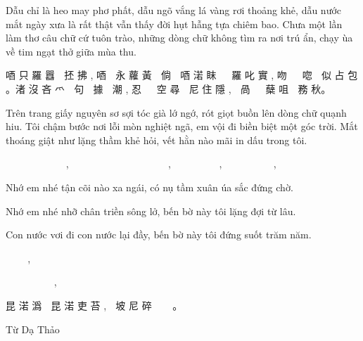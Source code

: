 \documentclass[14pt,a4paper]{extarticle}
\begin{document}
{\small \baselineskip=10pt Dẫu chỉ là heo may phơ phất, dẫu ngõ vắng lá vàng rơi thoảng khẻ, dẫu nước mắt ngày xưa là rất thật vẫn thấy đời hụt hẫng tựa chiêm bao. Chưa một lần làm thơ câu chữ cứ tuôn trào, những dòng chữ không tìm ra nơi trú ẩn, chạy ùa về tim ngạt thở giữa mùa thu. \par} \medskip 

 唒 只 羅 囂 𩘄         抷 拂 , 唒 𨳱 永 蘿 黃 𣑎 倘 𡃊
唒 渃    眜 𣈜 𠸗 羅 叱 實 , 吻 𧡊 𠁀 唿 𠾿 似 占
包    。渚    沒    吝    爫    𡮲    句    𡨸    據    𣻆    潮    ,    忍    𣳔    𡨸    空
 尋 𠚢 尼 住 隱 , 𧼋 咼 𧗱 𦙦 蘖 咀 𡨌 務 秋。\bigskip 
 
 {\small \baselineskip=10pt Trên trang giấy nguyên sơ sợi tóc già lớ ngớ,  rót giọt buồn lên dòng chữ quạnh hiu. Tôi chậm bước nơi lỗi mòn nghiệt ngã, em vội đi biền biệt một góc trời.  Mắt thoáng giật như lặng thầm khẻ hỏi, vết hằn nào mãi in dấu trong tôi.\par}\bigskip
 

𨕭 庄 紙 元 初 𥾘 𩯀 𦓅 捛 𠽐 , 淬 𠸂 𢞂 𨖲 𣳔
𡨸    𣔲    咻。碎    踸    𨀈    尼    磊    𤷱    蘖    我    ,    㛪    踣    𠫾    便
別    沒    㭲    𡗶,    眜    倘    突    如    朗    啿    𡃊    𠳨    ,    𤵖    垠    芾
印    買    𨁪    𥪝    碎。\bigskip 

{\small \baselineskip=10pt  Nhớ em nhé tận cõi nào xa ngái, có nụ tầm xuân úa sắc đứng chờ.

Nhớ em nhé nhỡ chân triền sông lở,  bến bờ này tôi lặng đợi từ lâu.

Con nước vơi đi con nước lại đầy, bến bờ này tôi đứng suốt trăm năm.

\par} \medskip 

𢖵㛪𠰚盡𡎝芾車𥇹,固𦵚荨春𦼇色𥪸
徐    。

𢖵    㛪    𠰚    𨀾    蹎    廛    滝    𡋿    ,    𡍣    坡    尼    碎    朗    待
自𥹰。

 昆 渃 潙 𠫾 昆 渃 吏 苔 , 𡍣 坡 尼 碎 𥪸 𢖀 𤾓𢆥。


\begin{flushright}
{\small Từ Dạ Thảo}
\end{flushright}


\newpage 

\small 
\end{document}
